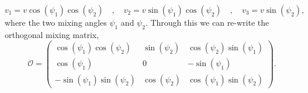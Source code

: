 \begin{equation}
v_1 = v \cos(\psi_1) \cos(\psi_2) \quad , \quad v_2 = v \sin(\psi_1) \cos(\psi_2) \quad , \quad v_3 = v \sin(\psi_2) , 
\end{equation}
%
where the two mixing angles $\psi_1$ and $\psi_2$. 
%
Through this we can re-write the orthogonal mixing matrix, 
%
\begin{equation}
\label{eq:3HDM_Orthg}
\mathcal{O} = 
\begin{pmatrix}
\cos(\psi_1) \cos(\psi_2) & \sin(\psi_2) & \cos(\psi_2) \sin(\psi_1)   \\ 
\cos(\psi_1) & 0 & - \sin(\psi_1)  \\ 
- \sin(\psi_1) \sin(\psi_2) & \cos(\psi_2) &  \cos(\psi_1) \sin(\psi_2)
\end{pmatrix} . 
\end{equation}

%
%

%
%
%
%

%
%
%

